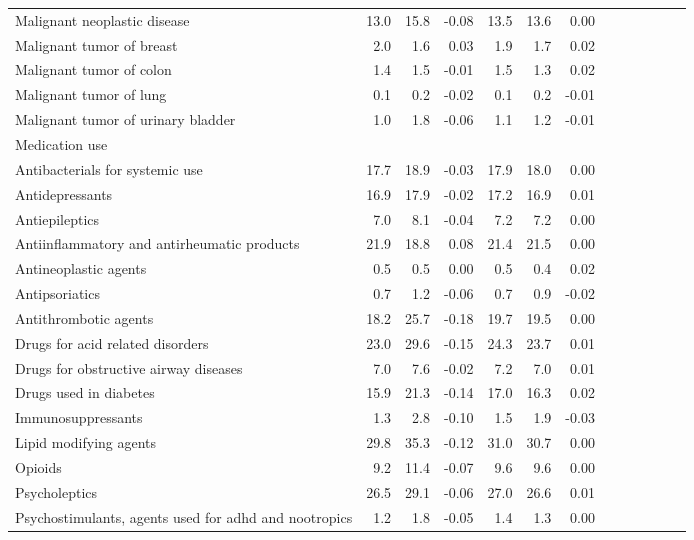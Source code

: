 \documentclass[11pt,]{article}
\begin{document}
\begin{longtable}{lrrrrrrrrrrrr}
      Malignant neoplastic disease & 13.0 & 15.8 & -0.08 & 13.5 & 13.6 &  0.00 \\ 
      Malignant tumor of breast &  2.0 &  1.6 &  0.03 &  1.9 &  1.7 &  0.02 \\ 
      Malignant tumor of colon &  1.4 &  1.5 & -0.01 &  1.5 &  1.3 &  0.02 \\ 
      Malignant tumor of lung &  0.1 &  0.2 & -0.02 &  0.1 &  0.2 & -0.01 \\ 
      Malignant tumor of urinary bladder &  1.0 &  1.8 & -0.06 &  1.1 &  1.2 & -0.01 \\ 
  Medication use &    &    &     &    &    &     \\ 
      Antibacterials for systemic use & 17.7 & 18.9 & -0.03 & 17.9 & 18.0 &  0.00 \\ 
      Antidepressants & 16.9 & 17.9 & -0.02 & 17.2 & 16.9 &  0.01 \\ 
      Antiepileptics &  7.0 &  8.1 & -0.04 &  7.2 &  7.2 &  0.00 \\ 
      Antiinflammatory and antirheumatic products & 21.9 & 18.8 &  0.08 & 21.4 & 21.5 &  0.00 \\ 
      Antineoplastic agents &  0.5 &  0.5 &  0.00 &  0.5 &  0.4 &  0.02 \\ 
      Antipsoriatics &  0.7 &  1.2 & -0.06 &  0.7 &  0.9 & -0.02 \\ 
      Antithrombotic agents & 18.2 & 25.7 & -0.18 & 19.7 & 19.5 &  0.00 \\ 
      Drugs for acid related disorders & 23.0 & 29.6 & -0.15 & 24.3 & 23.7 &  0.01 \\ 
      Drugs for obstructive airway diseases &  7.0 &  7.6 & -0.02 &  7.2 &  7.0 &  0.01 \\ 
      Drugs used in diabetes & 15.9 & 21.3 & -0.14 & 17.0 & 16.3 &  0.02 \\ 
      Immunosuppressants &  1.3 &  2.8 & -0.10 &  1.5 &  1.9 & -0.03 \\ 
      Lipid modifying agents & 29.8 & 35.3 & -0.12 & 31.0 & 30.7 &  0.00 \\ 
      Opioids &  9.2 & 11.4 & -0.07 &  9.6 &  9.6 &  0.00 \\ 
      Psycholeptics & 26.5 & 29.1 & -0.06 & 27.0 & 26.6 &  0.01 \\ 
      Psychostimulants, agents used for adhd and nootropics &  1.2 &  1.8 & -0.05 &  1.4 &  1.3 &  0.00 \\ 
   \bottomrule\end{longtable}
\clearpage
{}
\end{document}
